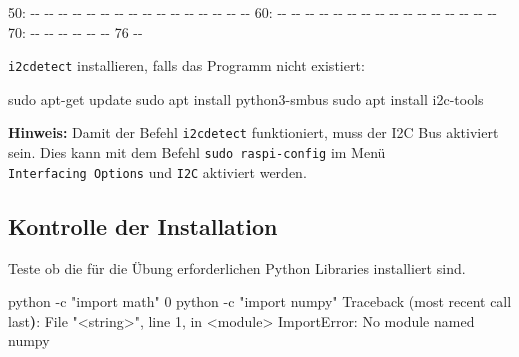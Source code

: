 \documentclass[
  11pt,
  a4paperpaper,
  oneside, openany  ,captions=tableheading
]{scrbook}
\newenvironment{Shaded}{\begin{snugshade}}{\end{snugshade}}
\newcommand{\AttributeTok}[1]{\textcolor[rgb]{0.40,0.45,0.13}{#1}}
\newcommand{\BuiltInTok}[1]{\textcolor[rgb]{0.00,0.23,0.31}{#1}}
\newcommand{\ErrorTok}[1]{\textcolor[rgb]{0.68,0.00,0.00}{#1}}
\newcommand{\ExtensionTok}[1]{\textcolor[rgb]{0.00,0.23,0.31}{#1}}
\newcommand{\FunctionTok}[1]{\textcolor[rgb]{0.28,0.35,0.67}{#1}}
\newcommand{\KeywordTok}[1]{\textcolor[rgb]{0.00,0.23,0.31}{\textbf{#1}}}
\newcommand{\NormalTok}[1]{\textcolor[rgb]{0.00,0.23,0.31}{#1}}
\newcommand{\OperatorTok}[1]{\textcolor[rgb]{0.37,0.37,0.37}{#1}}
\newcommand{\StringTok}[1]{\textcolor[rgb]{0.13,0.47,0.30}{#1}}
\theoremstyle{definition}
\theoremstyle{remark}
\newcommand*\circled[1]{\tikz[baseline=(char.base)]{
          \node[shape=circle,draw,inner sep=1pt] (char) {{\scriptsize#1}};}}
\begin{document}
\begin{Shaded}
\begin{Highlighting}[]
\ExtensionTok{50:} \AttributeTok{{-}{-}} \AttributeTok{{-}{-}} \AttributeTok{{-}{-}} \AttributeTok{{-}{-}} \AttributeTok{{-}{-}} \AttributeTok{{-}{-}} \AttributeTok{{-}{-}} \AttributeTok{{-}{-}} \AttributeTok{{-}{-}} \AttributeTok{{-}{-}} \AttributeTok{{-}{-}} \AttributeTok{{-}{-}} \AttributeTok{{-}{-}} \AttributeTok{{-}{-}} \AttributeTok{{-}{-}} \AttributeTok{{-}{-}} 
\ExtensionTok{60:} \AttributeTok{{-}{-}} \AttributeTok{{-}{-}} \AttributeTok{{-}{-}} \AttributeTok{{-}{-}} \AttributeTok{{-}{-}} \AttributeTok{{-}{-}} \AttributeTok{{-}{-}} \AttributeTok{{-}{-}} \AttributeTok{{-}{-}} \AttributeTok{{-}{-}} \AttributeTok{{-}{-}} \AttributeTok{{-}{-}} \AttributeTok{{-}{-}} \AttributeTok{{-}{-}} \AttributeTok{{-}{-}} \AttributeTok{{-}{-}} 
\ExtensionTok{70:} \AttributeTok{{-}{-}} \AttributeTok{{-}{-}} \AttributeTok{{-}{-}} \AttributeTok{{-}{-}} \AttributeTok{{-}{-}} \AttributeTok{{-}{-}}\NormalTok{ 76 }\AttributeTok{{-}{-}}  
\end{Highlighting}
\end{Shaded}

\texttt{i2cdetect} installieren, falls das Programm nicht existiert:

\begin{Shaded}
\begin{Highlighting}[]
\FunctionTok{sudo}\NormalTok{ apt{-}get update }
\FunctionTok{sudo}\NormalTok{ apt install python3{-}smbus}
\FunctionTok{sudo}\NormalTok{ apt install i2c{-}tools}
\end{Highlighting}
\end{Shaded}

\textbf{Hinweis:} Damit der Befehl \texttt{i2cdetect} funktioniert, muss
der I2C Bus aktiviert sein. Dies kann mit dem Befehl
\texttt{sudo\ raspi-config} im Menü \texttt{Interfacing\ Options} und
\texttt{I2C} aktiviert werden.

\subsection{Kontrolle der
Installation}\label{kontrolle-der-installation}

Teste ob die für die Übung erforderlichen Python Libraries installiert
sind.

\label{annotated-cell-5}%
\begin{Shaded}
\begin{Highlighting}[]
\ExtensionTok{python} \AttributeTok{{-}c} \StringTok{"import math"}
\ExtensionTok{0} \hspace*{\fill}\NormalTok{\circled{1}}
\ExtensionTok{python} \AttributeTok{{-}c} \StringTok{"import numpy"}
\ExtensionTok{Traceback} \ErrorTok{(}\ExtensionTok{most}\NormalTok{ recent call last}\KeywordTok{)}\BuiltInTok{:} \hspace*{\fill}\NormalTok{\circled{2}}
  \ExtensionTok{File} \StringTok{"\textless{}string\textgreater{}"}\NormalTok{, line 1, in }\OperatorTok{\textless{}}\NormalTok{module}\OperatorTok{\textgreater{}} 
\ExtensionTok{ImportError:}\NormalTok{ No module named numpy }
\end{Highlighting}
\end{Shaded}
\end{document}
